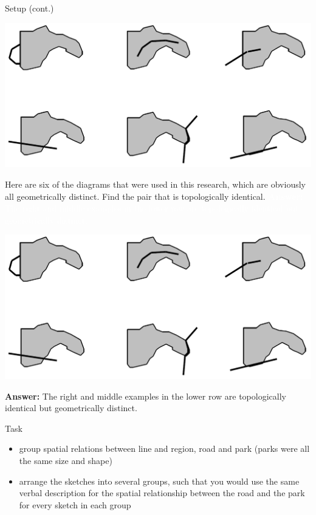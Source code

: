 \begin{frame}{Setup (cont.)}
	\only<1>
	{
		\centering \includegraphics[width=\textwidth]{images/evaluation_setup.png}
		\begin{center}
			Here are six of the diagrams that were used in this research, which are obviously all geometrically distinct. Find the pair that is topologically identical.
			\textcolor{white}{\textbf{Answer:} The right and middle examples in the lower row are topologically identical but geometrically distinct.}
		\end{center}
	}
	
	{
		\centering \includegraphics[width=\textwidth]{images/evaluation_setup.png}
		\begin{center}
			\textbf{Answer:} The right and middle examples in the lower row are topologically identical but geometrically distinct.
		\end{center}
	}
\end{frame}

\begin{frame}{Task}
	\begin{itemize}
		\item group spatial relations between line and region, road and park (parks were all the same size and shape)
		\item arrange the sketches into several groups, such that you would use the same verbal description for the spatial relationship between the road and the park for every sketch in each group
		
	\end{itemize}
\end{frame}

